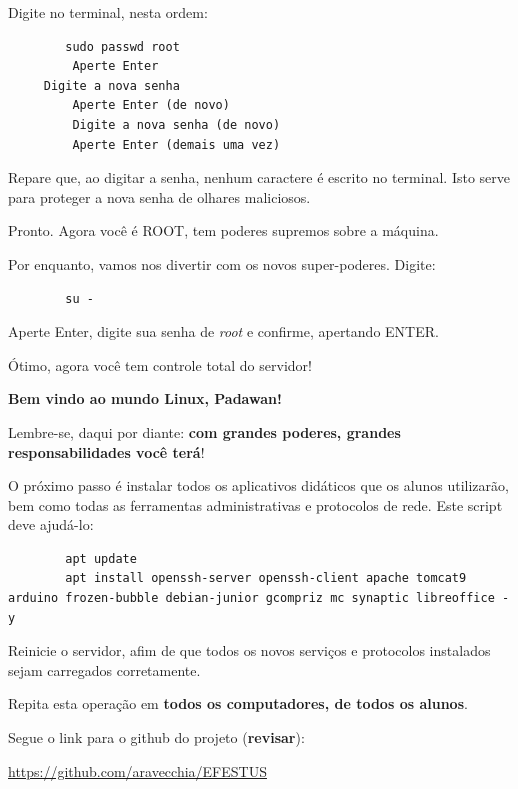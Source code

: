 \begin{multicols}{2}
	Digite no terminal, nesta ordem:
	
	\begin{lstlisting}
		sudo passwd root
		 Aperte Enter
	 Digite a nova senha
		 Aperte Enter (de novo)
		 Digite a nova senha (de novo)
		 Aperte Enter (demais uma vez)
	\end{lstlisting}
	
	Repare que, ao digitar a senha, nenhum caractere é escrito no terminal. Isto serve para proteger a nova senha de olhares maliciosos.
	
	Pronto. Agora você é ROOT, tem poderes supremos sobre a máquina.
	
	Por enquanto, vamos nos divertir com os novos super-poderes. Digite:
	
	\begin{lstlisting}
		su -
	\end{lstlisting}
	
	Aperte Enter, digite sua senha de \textit{root} e confirme, apertando ENTER.
	
	Ótimo, agora você tem controle total do servidor!
	
\textbf{Bem vindo ao mundo Linux, Padawan!}
	
Lembre-se, daqui por diante: \textbf{com grandes poderes, grandes responsabilidades você terá}!
	
	O próximo passo é instalar todos os aplicativos didáticos que os alunos utilizarão, bem como todas as ferramentas administrativas e protocolos de rede. Este script deve ajudá-lo:
	
	\begin{lstlisting}
		apt update
		apt install openssh-server openssh-client apache tomcat9 arduino frozen-bubble debian-junior gcompriz mc synaptic libreoffice -y
	\end{lstlisting}
	
	Reinicie o servidor, afim de que todos os novos serviços e protocolos instalados sejam carregados corretamente.
	
	Repita esta operação em \textbf{todos os computadores, de todos os alunos}.
	
	Segue o link para o github do projeto (\textbf{revisar}):
\end{multicols}

\begin{center}
	\Huge	\href{https://github.com/aravecchia/EFESTUS}{https://github.com/aravecchia/EFESTUS}
\end{center}

\vfill\null
\pagebreak

